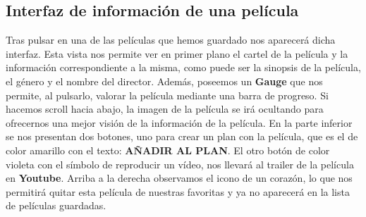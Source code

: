 \subsection{Interfaz de información de una película}
\label{makereference3.4.8}

Tras pulsar en una de las películas que hemos guardado nos aparecerá dicha interfaz. 
Esta vista nos permite ver en primer plano el cartel de la película y la información correspondiente a la misma, como puede
ser la sinopsis de la película, el género y el nombre del director. Además, poseemos un \textbf{Gauge} que nos permite, al pulsarlo,
valorar la película mediante una barra de progreso.
Si hacemos scroll hacia abajo, la imagen de la película se irá ocultando para ofrecernos una mejor visión de la información de la película.
En la parte inferior se nos presentan dos botones, uno para crear un plan con la película, que es el de color amarillo con el texto: \textbf{AÑADIR AL PLAN}. El otro botón de color
violeta con el símbolo de reproducir un vídeo, nos llevará al trailer de la película en \textbf{Youtube}.
Arriba a la derecha observamos el icono de un corazón, lo que nos permitirá quitar esta película de nuestras favoritas y ya no aparecerá en la
lista de películas guardadas.

